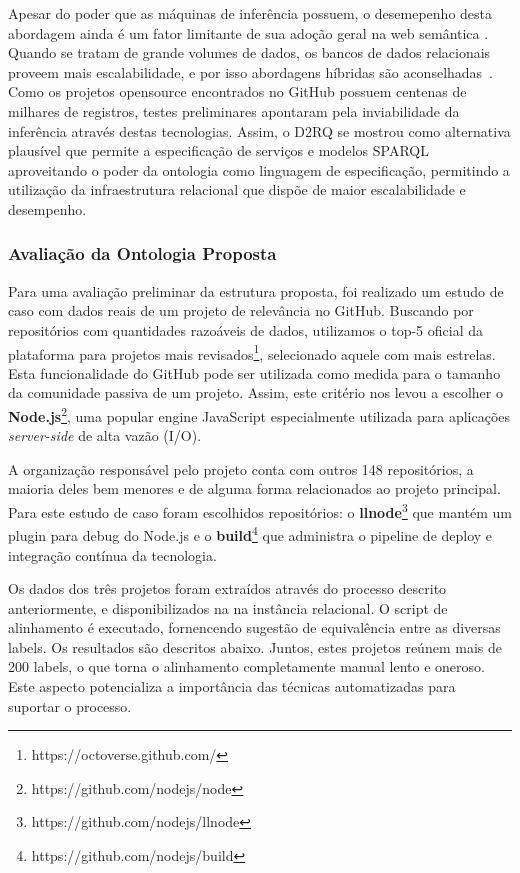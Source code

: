 \documentclass[sigconf]{acmart}
\begin{document}
Apesar do poder que as máquinas de inferência possuem, o desemepenho desta abordagem ainda é um fator limitante de sua adoção geral na web semântica \cite{shvaiko2013}. Quando se tratam de grande volumes de dados, os bancos de dados relacionais proveem mais escalabilidade, e por isso abordagens híbridas são aconselhadas~\cite{hepp2008}. Como os projetos opensource encontrados no GitHub possuem centenas de milhares de registros, testes preliminares apontaram pela inviabilidade da inferência através destas tecnologias. Assim, o D2RQ se mostrou como alternativa plausível que permite a especificação de serviços e modelos SPARQL aproveitando o poder da ontologia como linguagem de especificação, permitindo a utilização da infraestrutura relacional que dispõe de maior escalabilidade e desempenho.


\subsubsection{Avaliação da Ontologia Proposta}

Para uma avaliação preliminar da estrutura proposta, foi realizado um estudo de caso com dados reais de um projeto de relevância no GitHub. Buscando por repositórios com quantidades razoáveis de dados, utilizamos o top-5 oficial da plataforma para projetos mais revisados\footnote{https://octoverse.github.com/}, selecionado aquele com mais estrelas. Esta funcionalidade do GitHub pode ser utilizada como medida para o tamanho da comunidade passiva de um projeto\cite{sheoran2014}. Assim, este critério nos levou a escolher o \textbf{Node.js}\footnote{https://github.com/nodejs/node}, uma popular engine JavaScript especialmente utilizada para aplicações \textit{server-side} de alta vazão (I/O).

A organização responsável pelo projeto conta com outros 148 repositórios, a maioria deles bem menores e de alguma forma relacionados ao projeto principal. Para este estudo de caso foram escolhidos repositórios: o \textbf{llnode}\footnote{https://github.com/nodejs/llnode} que mantém um plugin para debug do Node.js e o \textbf{build}\footnote{https://github.com/nodejs/build} que administra o pipeline de deploy e integração contínua da tecnologia.

Os dados dos três projetos foram extraídos através do processo descrito anteriormente, e disponibilizados na na instância relacional. O script de alinhamento é executado, fornencendo sugestão de equivalência entre as diversas labels. Os resultados são descritos abaixo. Juntos, estes projetos reúnem mais de 200 labels, o que torna o alinhamento completamente manual lento e oneroso. Este aspecto potencializa a importância das técnicas automatizadas para suportar o processo.
\end{document}
